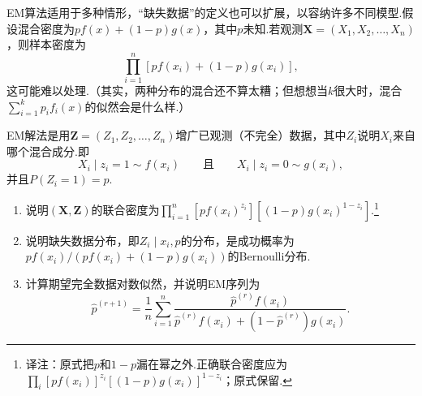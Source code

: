 \begin{exercise}\label{exercise:7.30}
EM算法适用于多种情形，“缺失数据”的定义也可以扩展，以容纳许多不同模型.假设混合密度为$pf(x)+(1-p)g(x)$，其中$p$未知.若观测$\boldsymbol X=(X_1,X_2,\ldots,X_n)$，则样本密度为
$$\prod_{i=1}^n[pf(x_i)+(1-p)g(x_i)],$$
这可能难以处理.（其实，两种分布的混合还不算太糟；但想想当$k$很大时，混合$\sum_{i=1}^kp_if_i(x)$的似然会是什么样.）

EM解法是用$\boldsymbol Z=(Z_1,Z_2,\ldots,Z_n)$增广已观测（不完全）数据，其中$Z_i$说明$X_i$来自哪个混合成分.即
$$X_i\mid z_i=1\sim f(x_i)\qquad\text{且}\qquad X_i\mid z_i=0\sim g(x_i),$$
并且$P(Z_i=1)=p$.
\begin{enumerate}[label=(\alph*)]
\item 说明$(\boldsymbol X,\boldsymbol Z)$的联合密度为$\prod_{i=1}^n[pf(x_i)^{z_i}][(1-p)g(x_i)^{1-z_i}]$.\footnote{译注：原式把$p$和$1-p$漏在幂之外.正确联合密度应为$\prod_i[pf(x_i)]^{z_i}[(1-p)g(x_i)]^{1-z_i}$；原式保留.}
\item 说明缺失数据分布，即$Z_i\mid x_i,p$的分布，是成功概率为$pf(x_i)/(pf(x_i)+(1-p)g(x_i))$的Bernoulli分布.
\item 计算期望完全数据对数似然，并说明EM序列为
$$\widehat p^{(r+1)}=\frac1n\sum_{i=1}^n\frac{\widehat p^{(r)}f(x_i)}{\widehat p^{(r)}f(x_i)+(1-\widehat p^{(r)})g(x_i)}.$$
\end{enumerate}
\end{exercise}
